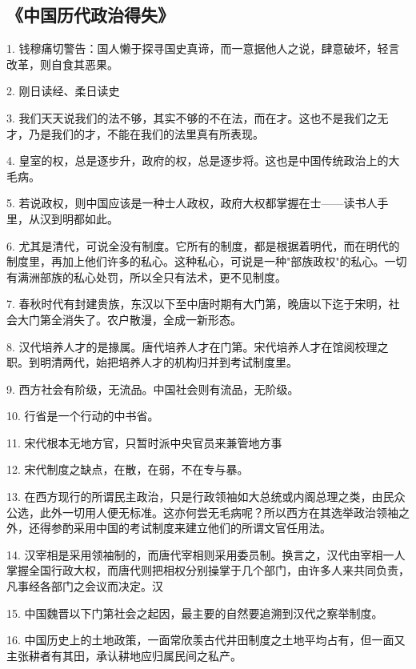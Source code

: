 \subsection{《中国历代政治得失》}
1. 钱穆痛切警告：国人懒于探寻国史真谛，而一意据他人之说，肆意破坏，轻言改革，则自食其恶果。

2. 刚日读经、柔日读史

3. 我们天天说我们的法不够，其实不够的不在法，而在才。这也不是我们之无才，乃是我们的才，不能在我们的法里真有所表现。

4. 皇室的权，总是逐步升，政府的权，总是逐步将。这也是中国传统政治上的大毛病。

5. 若说政权，则中国应该是一种士人政权，政府大权都掌握在士------读书人手里，从汉到明都如此。

6. 尤其是清代，可说全没有制度。它所有的制度，都是根据着明代，而在明代的制度里，再加上他们许多的私心。这种私心，可说是一种"部族政权"的私心。一切有满洲部族的私心处罚，所以全只有法术，更不见制度。

7. 春秋时代有封建贵族，东汉以下至中唐时期有大门第，晚唐以下迄于宋明，社会大门第全消失了。农户散漫，全成一新形态。

8. 汉代培养人才的是掾属。唐代培养人才在门第。宋代培养人才在馆阅校理之职。到明清两代，始把培养人才的机构归并到考试制度里。

9. 西方社会有阶级，无流品。中国社会则有流品，无阶级。

10. 行省是一个行动的中书省。

11. 宋代根本无地方官，只暂时派中央官员来兼管地方事

12. 宋代制度之缺点，在散，在弱，不在专与暴。

13. 在西方现行的所谓民主政治，只是行政领袖如大总统或内阁总理之类，由民众公选，此外一切用人便无标准。这亦何尝无毛病呢？所以西方在其选举政治领袖之外，还得参酌采用中国的考试制度来建立他们的所谓文官任用法。

14. 汉宰相是采用领袖制的，而唐代宰相则采用委员制。换言之，汉代由宰相一人掌握全国行政大权，而唐代则把相权分别操掌于几个部门，由许多人来共同负责，凡事经各部门之会议而决定。汉

15. 中国魏晋以下门第社会之起因，最主要的自然要追溯到汉代之察举制度。

16. 中国历史上的土地政策，一面常欣羡古代井田制度之土地平均占有，但一面又主张耕者有其田，承认耕地应归属民间之私产。
